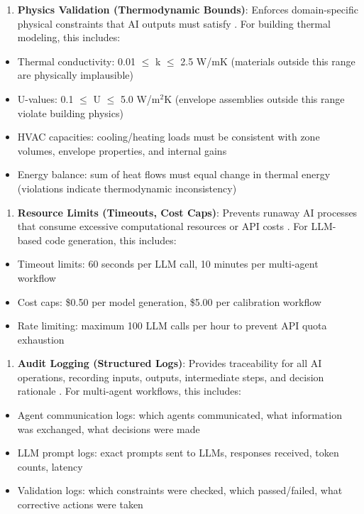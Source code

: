 \documentclass[12pt,a4paper]{article}
\begin{document}
\begin{enumerate}
  \item \textbf{Physics Validation (Thermodynamic Bounds)}: Enforces domain-specific physical constraints that AI outputs must satisfy \cite{ref175}. For building thermal modeling, this includes:
\end{enumerate}
\begin{itemize}
  \item Thermal conductivity: 0.01 $\leq$ k $\leq$ 2.5 W/mK (materials outside this range are physically implausible) \cite{ref176}
  \item U-values: 0.1 $\leq$ U $\leq$ 5.0 W/m$^2$K (envelope assemblies outside this range violate building physics) \cite{ref177}
  \item HVAC capacities: cooling/heating loads must be consistent with zone volumes, envelope properties, and internal gains \cite{ref178}
  \item Energy balance: sum of heat flows must equal change in thermal energy (violations indicate thermodynamic inconsistency) \cite{ref179}
\end{itemize}

\begin{enumerate}
  \item \textbf{Resource Limits (Timeouts, Cost Caps)}: Prevents runaway AI processes that consume excessive computational resources or API costs \cite{ref180}. For LLM-based code generation, this includes:
\end{enumerate}
\begin{itemize}
  \item Timeout limits: 60 seconds per LLM call, 10 minutes per multi-agent workflow \cite{ref181}
  \item Cost caps: \$0.50 per model generation, \$5.00 per calibration workflow \cite{ref182}
  \item Rate limiting: maximum 100 LLM calls per hour to prevent API quota exhaustion \cite{ref183}
\end{itemize}

\begin{enumerate}
  \item \textbf{Audit Logging (Structured Logs)}: Provides traceability for all AI operations, recording inputs, outputs, intermediate steps, and decision rationale \cite{ref184}. For multi-agent workflows, this includes:
\end{enumerate}
\begin{itemize}
  \item Agent communication logs: which agents communicated, what information was exchanged, what decisions were made \cite{ref185}
  \item LLM prompt logs: exact prompts sent to LLMs, responses received, token counts, latency \cite{ref186}
  \item Validation logs: which constraints were checked, which passed/failed, what corrective actions were taken \cite{ref187}
\end{itemize}
\end{document}
